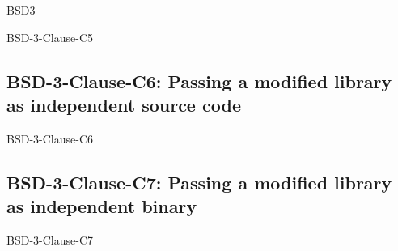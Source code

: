 \begin{license}{BSD3}
\begin{lsuc}{BSD-3-Clause-C5}
  \lsucmeans{\useCaseFive}
  \lsuccovers{\coversFive}

  \begin{lsucrequires}
    \lsucmandatory{\insertLicenseIntoBinary}\passingFilesCorrectly
    \lsucoptional{\addLicenseToCopyrightMessage}
  \end{lsucrequires}

  \begin{lsucprohibits}
    \lsucitem{\dontUseAuthorNames}%
  \end{lsucprohibits}
\end{lsuc}

\subsection{BSD-3-Clause-C6: Passing a modified library as independent source code}
\begin{lsuc}{BSD-3-Clause-C6}

  \lsucmeans{\useCaseSix}
  \lsuccovers{\coversSix}

  \begin{lsucrequires}
    \lsucmandatory{\keepLicenseElements}
  \end{lsucrequires}

  \begin{lsucprohibits}
    \lsucitem{\dontUseAuthorNames}%
  \end{lsucprohibits}
\end{lsuc}

\subsection{BSD-3-Clause-C7: Passing a modified library as independent binary}
\begin{lsuc}{BSD-3-Clause-C7}

  \lsucmeans{\useCaseSeven}
  \lsuccovers{\coversSeven}

  \begin{lsucrequires}
    \lsucmandatory{\insertLicenseIntoBinary}\passingFilesCorrectly
  \end{lsucrequires}

  \begin{lsucprohibits}
    \lsucitem{\dontUseAuthorNames}%
  \end{lsucprohibits}
\end{lsuc}


\end{license}
